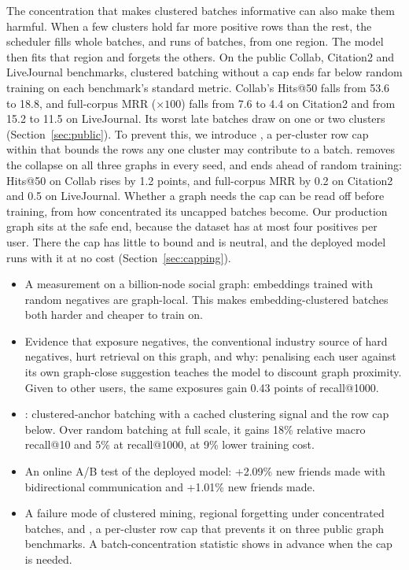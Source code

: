  The concentration that makes clustered batches informative can also make them
harmful. When a few clusters hold far more positive rows than the rest, the scheduler fills whole batches, and runs of
batches, from one region. The model then fits that region and forgets the others. On the public Collab, Citation2 and
LiveJournal benchmarks, clustered batching without a cap ends far below random training on each benchmark's standard
metric. Collab's Hits@50 falls from 53.6 to 18.8, and full-corpus MRR ($\times 100$) falls from 7.6 to 4.4 on Citation2
and from 15.2 to 11.5 on LiveJournal. Its worst late batches draw on one or two clusters (Section~\ref{sec:public}).
To prevent this, we introduce \rowcap{}, a per-cluster row cap within \ours{} that bounds the rows any one cluster
may contribute to a batch. \rowcap{} removes the collapse on all three graphs in every seed, and \ours{} ends ahead of random training: Hits@50 on Collab rises by 1.2 points, and full-corpus
MRR by 0.2 on Citation2 and 0.5 on LiveJournal. Whether a graph needs the cap can be read off before training, from how
concentrated its uncapped batches become. Our production graph sits at the safe end, because the dataset has
at most four positives per user. There the cap has little to bound and is neutral, and the deployed model runs with it
at no cost (Section~\ref{sec:capping}).

\begin{itemize}[leftmargin=*]
  \item A measurement on a billion-node social graph: embeddings trained with random negatives are graph-local. This
        makes embedding-clustered batches both harder and cheaper to train on.
  \item Evidence that exposure negatives, the conventional industry source of hard negatives, hurt retrieval on this
        graph, and why: penalising each user against its own graph-close suggestion teaches the model to discount graph
        proximity. Given to other users, the same exposures gain 0.43 points of recall@1000.
  \item \ours{}: clustered-anchor batching with a cached clustering signal and the row cap below. Over random
        batching at full scale, it gains 18\% relative macro recall@10 and 5\% at recall@1000, at 9\% lower training
        cost.
  \item An online A/B test of the deployed model: +2.09\% new friends made with bidirectional communication and
        +1.01\% new friends made.
  \item A failure mode of clustered mining, regional forgetting under concentrated batches, and \rowcap{}, a
        per-cluster row cap that prevents it on three public graph benchmarks. A batch-concentration statistic shows in advance
        when the cap is needed.
\end{itemize}
